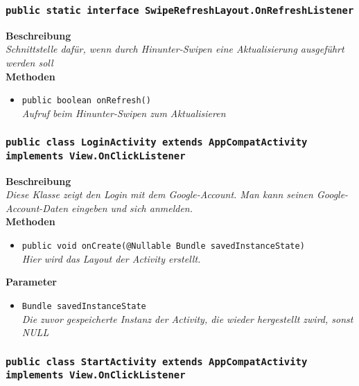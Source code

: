 \subsubsection{\texttt{public static interface SwipeRefreshLayout.OnRefreshListener}}

	\textbf{Beschreibung} \\
	\textit{Schnittstelle dafür, wenn durch Hinunter-Swipen eine Aktualisierung ausgeführt werden soll} \\

	\textbf{Methoden}
	\begin{itemize}
		\item\texttt{{public boolean onRefresh()}}\\
	\textit{Aufruf beim Hinunter-Swipen zum Aktualisieren}\\
	\end{itemize}       

\subsubsection{\texttt{public class LoginActivity \textbf{extends} AppCompatActivity \textbf{implements} View.OnClickListener}}

	\textbf{Beschreibung} \\
	\textit{Diese Klasse zeigt den Login mit dem Google-Account. Man kann seinen Google-Account-Daten eingeben und sich anmelden.} \\

	\textbf{Methoden}
	\begin{itemize}
		\item\texttt{{public void onCreate(@Nullable Bundle savedInstanceState)}}\\
	\textit{Hier wird das Layout der Activity erstellt.}\\
	\end{itemize}

	\textbf{Parameter}
	\begin{itemize}
		\item\texttt{Bundle savedInstanceState}\\ 
	\textit{Die zuvor gespeicherte Instanz der Activity, die wieder hergestellt zwird, sonst NULL}\\
	\end{itemize}

\subsubsection{\texttt{public class StartActivity extends AppCompatActivity implements View.OnClickListener}}

